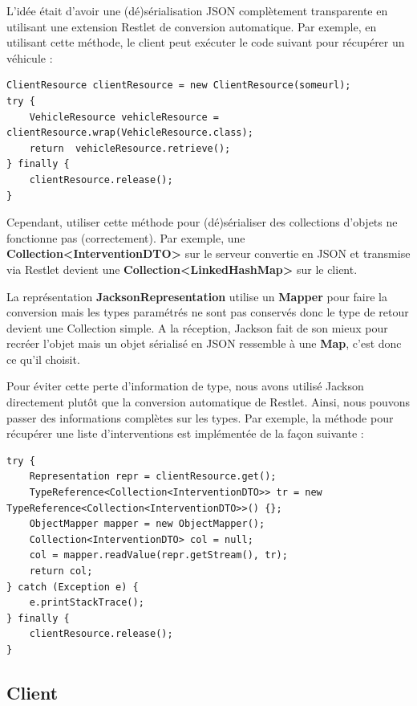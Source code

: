\documentclass{article}
\begin{document}
L’idée était d’avoir une (dé)sérialisation JSON complètement transparente en utilisant une extension Restlet de conversion automatique. Par exemple, en utilisant cette méthode, le client peut exécuter le code suivant pour récupérer un véhicule :


\begin{lstlisting}
ClientResource clientResource = new ClientResource(someurl);
try {
    VehicleResource vehicleResource = clientResource.wrap(VehicleResource.class);
    return  vehicleResource.retrieve();
} finally {
    clientResource.release();
}
\end{lstlisting}


Cependant, utiliser cette méthode pour (dé)sérialiser des collections d’objets ne fonctionne pas (correctement). Par exemple, une \textbf{Collection<InterventionDTO>} sur le serveur convertie en JSON et transmise via Restlet devient une \textbf{Collection<LinkedHashMap>} sur le client.

La représentation \textbf{JacksonRepresentation} utilise un \textbf{Mapper} pour faire la conversion mais les types paramétrés ne sont pas conservés donc le type de retour devient une Collection simple. A la réception, Jackson fait de son mieux pour recréer l’objet mais un objet sérialisé en JSON ressemble à une \textbf{Map}, c’est donc ce qu’il choisit.

Pour éviter cette perte d’information de type, nous avons utilisé Jackson directement plutôt que la conversion automatique de Restlet. Ainsi, nous pouvons passer des informations complètes sur les types. Par exemple, la méthode pour récupérer une liste d’interventions est implémentée de la façon suivante :

\begin{lstlisting}
try {
    Representation repr = clientResource.get();
    TypeReference<Collection<InterventionDTO>> tr = new TypeReference<Collection<InterventionDTO>>() {};
    ObjectMapper mapper = new ObjectMapper();
    Collection<InterventionDTO> col = null;
    col = mapper.readValue(repr.getStream(), tr);
    return col;
} catch (Exception e) {
    e.printStackTrace();
} finally {
    clientResource.release();
}
\end{lstlisting}


\subsection{Client}
\end{document}
